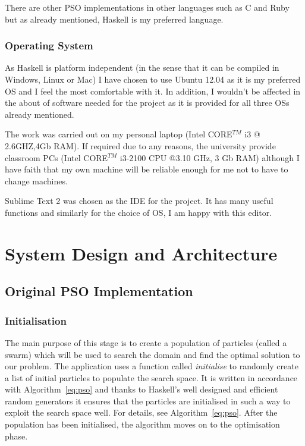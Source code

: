 \documentclass{pdfmx4020}
\begin{document}
      There are other PSO implementations in other languages such as C and Ruby but as already mentioned, Haskell is my preferred language. 

    \subsection{Operating System} %
    \label{sub:operating_system}
    As Haskell is platform independent (in the sense that it can be compiled in Windows, Linux or Mac) I have chosen to use Ubuntu 12.04 as it is my preferred OS and I feel the most comfortable with it. In addition, I wouldn't be affected in the about of software needed for the project as it is provided for all three OSs already mentioned. 

    The work was carried out on my personal laptop (Intel CORE$^{TM}$ i3 @ 2.6GHZ,4Gb RAM). If required due to any reasons, the university provide classroom PCs (Intel CORE$^{TM}$ i3-2100 CPU @3.10 GHz, 3 Gb RAM) although I have faith that my own machine will be reliable enough for me not to have to change machines. 
    
    Sublime Text 2 was chosen as the IDE for the project. It has many useful functions \cite{sublime} and similarly for the choice of OS, I am happy with this editor.
  

\chapter{System Design and Architecture}

  \section{Original PSO Implementation} %
  \label{sec:original_pso_implementation}
    \subsection{Initialisation} %
    \label{sub:initialisation}
    The main purpose of this stage is to create a population of particles (called a swarm) which will be used to search the domain and find the optimal solution to our problem. The application uses a function called \textit{initialise} to randomly create a list of initial particles to populate the search space. It is written in accordance with Algorithm~\ref{eq:pso} and thanks to Haskell's well designed and efficient random generators \cite{random} it ensures that the particles are initialised in such a way to exploit the search space well. For details, see Algorithm~\ref{eq:pso}. After the population has been initialised, the algorithm moves on to the optimisation phase.
\end{document}
